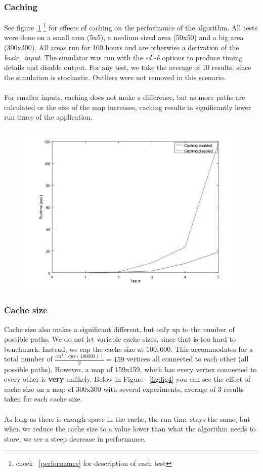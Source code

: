 \documentclass{article}
\begin{document}
	\subsubsection{Caching}
		See figure~\ref{fig:fig3} \footnote{check ~\ref{performance} for description of each test}  for effects of caching on the performance of the algorithm. All tests were done on a small area (5x5), a medium sized area (50x50)
		and a big area (300x300). All areas run for 100 hours and are otherwise a derivation of the \textit{basic\_input}. The simulator was run with the \textit{-d -b} options
		to produce timing details and disable output. For any test, we take the average of 10 results, since the simulation is stochastic. Outliers were not removed
		in this scenario.
		\\
		\\
		For smaller inputs, caching does not make a difference, but as more paths are calculated or the size of the map increases,
		caching results in significantly lower run times of the application.
		\begin{figure}[H]
		\centering
			\includegraphics[width=.55\columnwidth]{resources/caching_performance.jpg}
			\label{fig:fig3}
		\end{figure}

		\subsubsection{Cache size} \label{cs}
			Cache size also makes a significant different, but only up to the number of possible paths. We do not let variable cache sizes,
			since that is too hard to benchmark. Instead, we cap the cache size at $100,000$. This accommodates for a total number of $\frac{ceil(sqrt(100000))}{2} = 159$ vertices
			all connected to each other (all possible paths). However, a map of 159x159, which has every vertex connected to every other is \textbf{very} unlikely. Below in Figure ~\ref{fig:fig4}
			you can see the effect of cache size on a map of 300x300 with several experiments, average of 3 results taken for each cache size.
			\\
			\\
			As long as there is enough space in the cache, the run time stays the same, but when we reduce the cache size to a value lower than what the algorithm needs
			to store, we see a steep decrease in performance.
		
\end{document}
